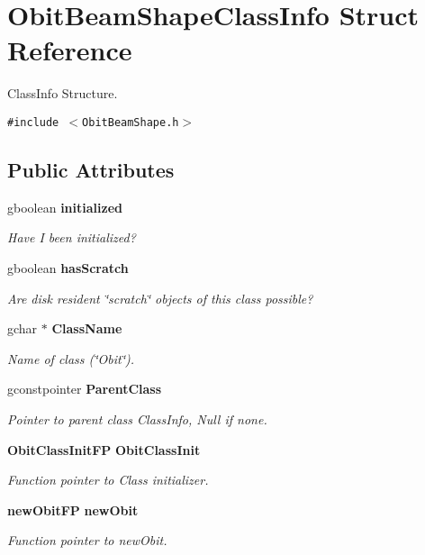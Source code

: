 \section{Obit\-Beam\-Shape\-Class\-Info Struct Reference}
\label{structObitBeamShapeClassInfo}
Class\-Info Structure.  


{\tt \#include $<$Obit\-Beam\-Shape.h$>$}

\subsection*{Public Attributes}
\begin{CompactItemize}
\item 
gboolean {\bf initialized}
\begin{CompactList}\small\item\em Have I been initialized? \item\end{CompactList}\item 
gboolean {\bf has\-Scratch}
\begin{CompactList}\small\item\em Are disk resident \char`\"{}scratch\char`\"{} objects of this class possible? \item\end{CompactList}\item 
gchar $\ast$ {\bf Class\-Name}
\begin{CompactList}\small\item\em Name of class (\char`\"{}Obit\char`\"{}). \item\end{CompactList}\item 
gconstpointer {\bf Parent\-Class}
\begin{CompactList}\small\item\em Pointer to parent class Class\-Info, Null if none. \item\end{CompactList}\item 
{\bf Obit\-Class\-Init\-FP} {\bf Obit\-Class\-Init}
\begin{CompactList}\small\item\em Function pointer to Class initializer. \item\end{CompactList}\item 
{\bf new\-Obit\-FP} {\bf new\-Obit}
\begin{CompactList}\small\item\em Function pointer to new\-Obit. \item\end{CompactList}\item 

\end{CompactItemize}

